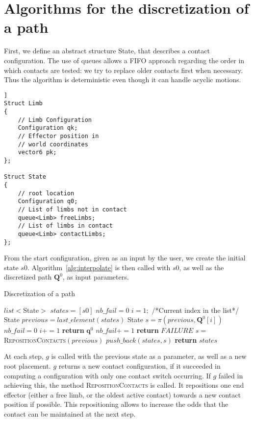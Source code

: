 \section{Algorithms for the discretization of a path}
\label{app:contact}


First, we define an abstract structure State,
that describes a contact configuration.
The use of queues allows a FIFO approach regarding the order 
in which contacts are tested: we try to replace older contacts first when necessary.
Thus the algorithm is deterministic even though it can handle acyclic motions.

\begin{lstlisting}]
Struct Limb
{
    // Limb Configuration
    Configuration qk;
    // Effector position in
    // world coordinates
    vector6 pk;
};

Struct State
{
    // root location
    Configuration q0;
    // List of limbs not in contact
    queue<Limb> freeLimbs;
    // List of limbs in contact
    queue<Limb> contactLimbs;
};
\end{lstlisting}

From the start configuration, given as an input by the user,
we create the initial state $s0$.
Algorithm~\ref{alg:interpolate}  is then called with $s0$, as well as the discretized path 
$\mathbf{Q}^0$, as input parameters.

\begin{algorithm}
\caption{Discretization of a path} \label{interpolate}
	\begin{algorithmic}[1]
		\State $list<$State$>$ $states = [s0]$
		\State $nb\_fail = 0$ 
		\State $i = 1;$ /*Current index in the list*/
			\State State $previous = last\_element(states)$
			\State State $s = \pi(previous, \mathbf{Q}^0[i])$
				\State $nb\_fail = 0$
				\State $i += 1$
				\State \textbf{return} $\mathbf{q}^{0}$
			\Else
				\State $nb\_fail += 1$
					\State \textbf{return} $FAILURE$
				\EndIf				
				\State $s = $\textsc{RepositionContacts}$(previous)$
			\EndIf
			\State $push\_back(states, s)$
		\EndWhile
		\State \textbf{return} $states$
	\EndFunction
\end{algorithmic}
\label{alg:interpolate}
\end{algorithm}

At each step, $g$ is called with the previous state as a parameter, as well
as a new root placement. $g$ returns a new contact configuration, if it succeeded
in computing a configuration with only one contact switch occurring.
If $g$ failed in achieving this, the method \textsc{RepositionContacts} is called.
It repositions one end effector (either a free limb, or the oldest active contact) towards a new contact position if possible.
This repositioning allows to increase the odds that the contact can be maintained at the next step.

